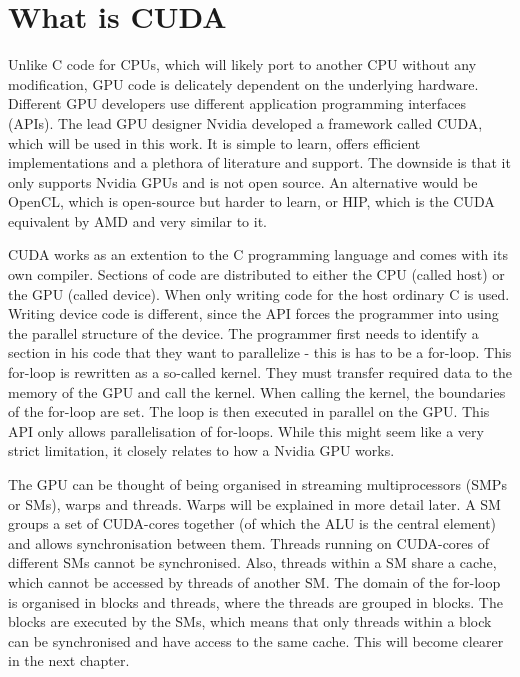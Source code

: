 \section{What is CUDA}
Unlike C code for CPUs, which will likely port to another CPU without any modification, GPU code is delicately dependent on the underlying hardware.
Different GPU developers use different application programming interfaces (APIs).
The lead GPU designer Nvidia developed a framework called CUDA, which will be used in this work.
It is simple to learn, offers efficient implementations and a plethora of literature and support.
The downside is that it only supports Nvidia GPUs and is not open source.
An alternative would be OpenCL, which is open-source but harder to learn, or HIP, which is the CUDA equivalent by AMD and very similar to it.

CUDA works as an extention to the C programming language and comes with its own compiler.
Sections of code are distributed to either the CPU (called host) or the GPU (called device).
When only writing code for the host ordinary C is used.
Writing device code is different, since the API forces the programmer into using the parallel structure of the device.
The programmer first needs to identify a section in his code that they want to parallelize - this is has to be a for-loop.
This for-loop is rewritten as a so-called kernel.
They must transfer required data to the memory of the GPU and call the kernel.
When calling the kernel, the boundaries of the for-loop are set.
The loop is then executed in parallel on the GPU.
This API only allows parallelisation of for-loops.
While this might seem like a very strict limitation, it closely relates to how a Nvidia GPU works.

The GPU can be thought of being organised in streaming multiprocessors (SMPs or SMs), warps and threads.
Warps will be explained in more detail later.
A SM groups a set of CUDA-cores together (of which the ALU is the central element) and allows synchronisation between them.
Threads running on CUDA-cores of different SMs cannot be synchronised.
Also, threads within a SM share a cache, which cannot be accessed by threads of another SM.
The domain of the for-loop is organised in blocks and threads, where the threads are grouped in blocks.
The blocks are executed by the SMs, which means that only threads within a block can be synchronised and have access to the same cache.
This will become clearer in the next chapter.
